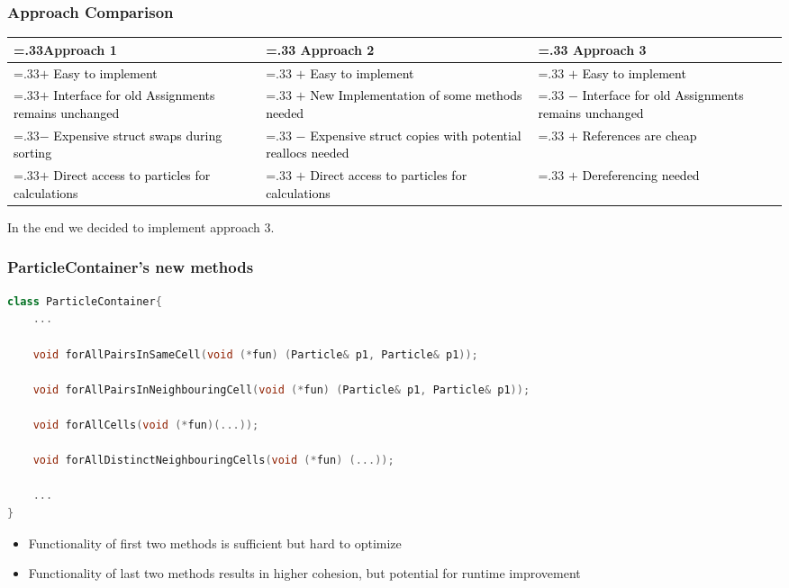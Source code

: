 \begin{frame}
	\frametitle{Approach Comparison}
	\large
	\setlength\tabcolsep{0.5cm}
	\def\arraystretch{1.5}
	\begin{tabularx}{\linewidth}{>{\hsize=.33\hsize}X|>{\hsize=.33\hsize}X|>{\hsize=.33\hsize}X}		
		
		Approach 1 & Approach 2 & Approach 3 \\
		\hline
		\textcolor{black}{$+$ Easy to implement} & 
		\textcolor{black}{$+$ Easy to implement} &
		\textcolor{black}{$+$ Easy to implement} \\ 
		
		
		
		\textcolor{black}{$+$ Interface for old Assignments remains unchanged} & 
		\textcolor{black}{$+$ New Implementation of some methods needed} &
		\textcolor{black}{$-$ Interface for old Assignments remains unchanged} \\
		
		\textcolor{black}{$-$ Expensive struct swaps during sorting} & 
		\textcolor{black}{$-$ Expensive struct copies with potential reallocs needed} &
		\textcolor{black}{$+$ References are cheap} \\
		
		\textcolor{black}{$+$ Direct access to particles for calculations} & 
		\textcolor{black}{$+$ Direct access to particles for calculations}&
		\textcolor{black}{$+$ Dereferencing needed} \\		
	\end{tabularx}

	\pause
	\vspace{0.4cm}
	In the end we decided to implement approach 3.
\end{frame}


\begin{frame}[fragile]
	\frametitle{ParticleContainer's new methods}
	\vspace{0.4cm}
	
	\begin{lstlisting}[language=C++]
class ParticleContainer{
	...

	void forAllPairsInSameCell(void (*fun) (Particle& p1, Particle& p1));
	
	void forAllPairsInNeighbouringCell(void (*fun) (Particle& p1, Particle& p1));
	
	void forAllCells(void (*fun)(...));
	
	void forAllDistinctNeighbouringCells(void (*fun) (...));
		
	...
}
\end{lstlisting}

	\large

\begin{itemize}
	\item Functionality of first two methods is sufficient but hard to optimize
	\item Functionality of last two methods results in higher cohesion, but potential for runtime improvement
\end{itemize}
	
\end{frame}

